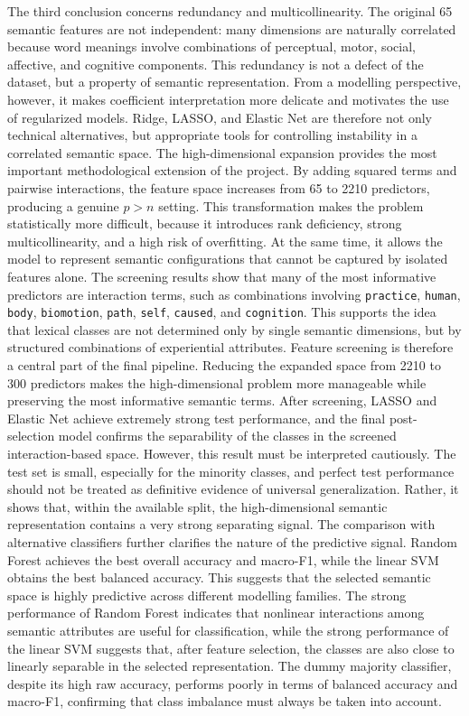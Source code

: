\documentclass{ipgpmaster}
\begin{document}
The third conclusion concerns redundancy and multicollinearity. The original 65 semantic features are not independent: many dimensions are naturally correlated because word meanings involve combinations of perceptual, motor, social, affective, and cognitive components. This redundancy is not a defect of the dataset, but a property of semantic representation. From a modelling perspective, however, it makes coefficient interpretation more delicate and motivates the use of regularized models. Ridge, LASSO, and Elastic Net are therefore not only technical alternatives, but appropriate tools for controlling instability in a correlated semantic space.
The high-dimensional expansion provides the most important methodological extension of the project. By adding squared terms and pairwise interactions, the feature space increases from 65 to 2210 predictors, producing a genuine \(p>n\) setting. This transformation makes the problem statistically more difficult, because it introduces rank deficiency, strong multicollinearity, and a high risk of overfitting. At the same time, it allows the model to represent semantic configurations that cannot be captured by isolated features alone. The screening results show that many of the most informative predictors are interaction terms, such as combinations involving \texttt{practice}, \texttt{human}, \texttt{body}, \texttt{biomotion}, \texttt{path}, \texttt{self}, \texttt{caused}, and \texttt{cognition}. This supports the idea that lexical classes are not determined only by single semantic dimensions, but by structured combinations of experiential attributes.
Feature screening is therefore a central part of the final pipeline. Reducing the expanded space from 2210 to 300 predictors makes the high-dimensional problem more manageable while preserving the most informative semantic terms. After screening, LASSO and Elastic Net achieve extremely strong test performance, and the final post-selection model confirms the separability of the classes in the screened interaction-based space. However, this result must be interpreted cautiously. The test set is small, especially for the minority classes, and perfect test performance should not be treated as definitive evidence of universal generalization. Rather, it shows that, within the available split, the high-dimensional semantic representation contains a very strong separating signal.
The comparison with alternative classifiers further clarifies the nature of the predictive signal. Random Forest achieves the best overall accuracy and macro-F1, while the linear SVM obtains the best balanced accuracy. This suggests that the selected semantic space is highly predictive across different modelling families. The strong performance of Random Forest indicates that nonlinear interactions among semantic attributes are useful for classification, while the strong performance of the linear SVM suggests that, after feature selection, the classes are also close to linearly separable in the selected representation. The dummy majority classifier, despite its high raw accuracy, performs poorly in terms of balanced accuracy and macro-F1, confirming that class imbalance must always be taken into account.
\end{document}
